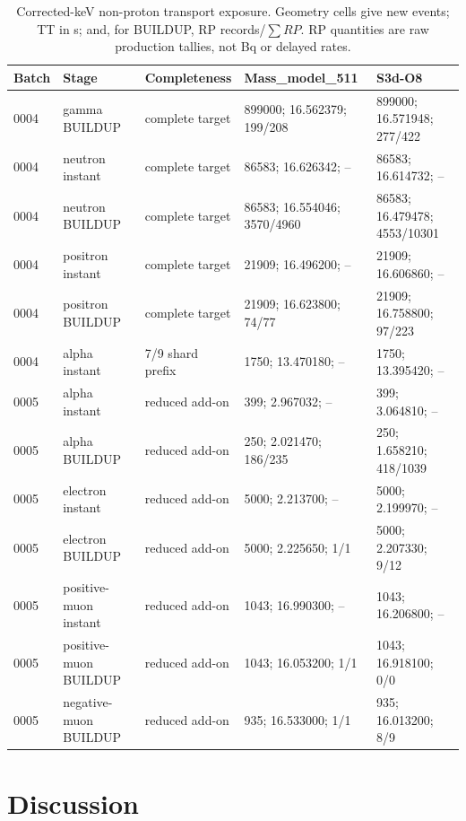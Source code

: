 \documentclass[11pt]{article}
\begin{document}
\begin{landscape}
\begin{table}[t]
\centering
\caption{Corrected-keV non-proton transport exposure. Geometry cells give
new events; TT in s; and, for BUILDUP, RP records/$\sum RP$. RP quantities are
raw production tallies, not Bq or delayed rates.}
\label{tab:m06_transport_exposure}
\scriptsize
\begin{tabular}{lllll}
\toprule
Batch & Stage & Completeness & Mass\_model\_511 & S3d-O8 \\
\midrule
0004 & gamma BUILDUP & complete target & 899000; 16.562379; 199/208 & 899000; 16.571948; 277/422 \\
0004 & neutron instant & complete target & 86583; 16.626342; -- & 86583; 16.614732; -- \\
0004 & neutron BUILDUP & complete target & 86583; 16.554046; 3570/4960 & 86583; 16.479478; 4553/10301 \\
0004 & positron instant & complete target & 21909; 16.496200; -- & 21909; 16.606860; -- \\
0004 & positron BUILDUP & complete target & 21909; 16.623800; 74/77 & 21909; 16.758800; 97/223 \\
0004 & alpha instant & 7/9 shard prefix & 1750; 13.470180; -- & 1750; 13.395420; -- \\
\midrule
0005 & alpha instant & reduced add-on & 399; 2.967032; -- & 399; 3.064810; -- \\
0005 & alpha BUILDUP & reduced add-on & 250; 2.021470; 186/235 & 250; 1.658210; 418/1039 \\
0005 & electron instant & reduced add-on & 5000; 2.213700; -- & 5000; 2.199970; -- \\
0005 & electron BUILDUP & reduced add-on & 5000; 2.225650; 1/1 & 5000; 2.207330; 9/12 \\
0005 & positive-muon instant & reduced add-on & 1043; 16.990300; -- & 1043; 16.206800; -- \\
0005 & positive-muon BUILDUP & reduced add-on & 1043; 16.053200; 1/1 & 1043; 16.918100; 0/0 \\
0005 & negative-muon BUILDUP & reduced add-on & 935; 16.533000; 1/1 & 935; 16.013200; 8/9 \\
\bottomrule
\end{tabular}
\end{table}
\end{landscape}

\section{Discussion}
\label{sec:discussion}
\end{document}
